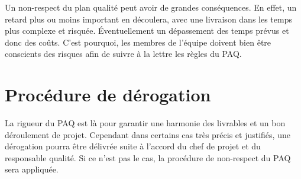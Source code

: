 Un non-respect du plan qualité peut avoir de grandes conséquences. En effet, un retard plus ou moins important en découlera, avec une livraison dans les temps plus complexe et risquée. Éventuellement un dépassement des temps prévus et donc des coûts. C’est pourquoi, les membres de l’équipe doivent bien être conscients des risques afin de suivre à la lettre les règles du PAQ.
    
\section{Procédure de dérogation}

La rigueur du PAQ est là pour garantir une harmonie des livrables et un bon déroulement de projet. Cependant dans certains cas très précis et justifiés, une dérogation pourra être délivrée suite à l’accord du chef de projet et du responsable qualité. Si ce n’est pas le cas, la procédure de non-respect du PAQ sera appliquée.
